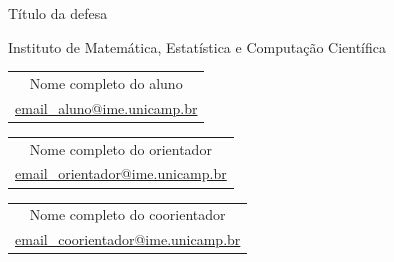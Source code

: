 \documentclass[]{beamer}
\begin{document}
\begin{frame}[t,fragile]
  \begin{center}
    \begin{huge}
      Título da defesa

      \vspace{20pt}
      Instituto de Matemática, Estatística e Computação Científica
    \end{huge}

    \vspace{20pt}
    \begin{Large}
      \begin{tabular}[]{c}
        Nome completo do aluno \\
        \url{email_aluno@ime.unicamp.br}
      \end{tabular} \hspace{5cm}
      \begin{tabular}[]{c}
        Nome completo do orientador \\
        \url{email_orientador@ime.unicamp.br}
      \end{tabular}
      \hspace{5cm}
      \begin{tabular}[]{c}
        Nome completo do coorientador \\
        \url{email_coorientador@ime.unicamp.br}
      \end{tabular}
    \end{Large}
  \end{center}
  \vspace{20pt}


\end{frame}
\end{document}
